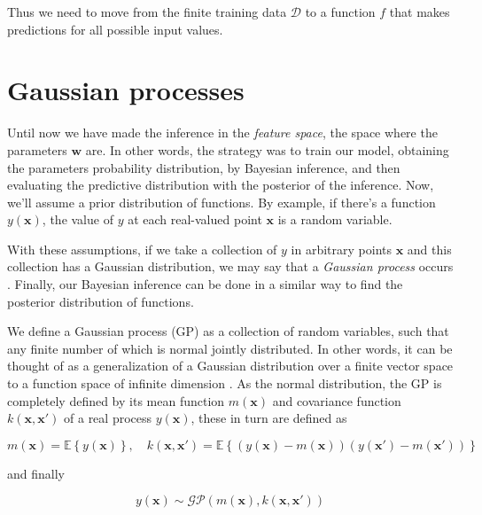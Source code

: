 \documentclass[11pt]{article} %
\begin{document}
Thus we need to move from the finite training data $\mathcal{D}$ to a function $f$ that makes predictions for all possible input values. %

\section{Gaussian processes}

Until now we have made the inference in the \textit{feature space}, the space where the parameters $\mathbf{w}$ are. In other words, the strategy was to train our model, obtaining the parameters probability distribution, by Bayesian inference, and then evaluating the predictive distribution with the posterior of the inference. Now, we'll assume a prior distribution of functions. By example, if there's a function $y(\mathbf{x})$, the value of $y$ at each real-valued point $\mathbf{x}$ is a random variable.

With these assumptions, if we take a collection of $y$ in arbitrary points $\mathbf{x}$ and this collection has a Gaussian distribution, we may say that a \textit{Gaussian process} occurs \cite{Rasmussen:2005:GPM:1162254}. Finally, our Bayesian inference can be done in a similar way to find the posterior distribution of functions.

We define a Gaussian process (GP) as a collection of random variables, such that any finite number of which is normal jointly distributed. In other words, it can be thought  of as a generalization of a Gaussian distribution over a finite vector space to a function space of infinite dimension \cite{mackay1998introduction}. As the normal distribution, the GP is completely defined by its mean function $m(\mathbf{x})$ and covariance function $k(\mathbf{x},\mathbf{x'})$ of a real process $y(\mathbf{x})$, these in turn are defined as

\begin{equation}
   m(\mathbf{x}) = \mathbb{E}\left\{ y(\mathbf{x}) \right\}, \quad
   k(\mathbf{x},\mathbf{x'}) = \mathbb{E}\left\{ \left( y(\mathbf{x}) - m(\mathbf{x}) \right) \left( y(\mathbf{x'}) - m(\mathbf{x'}) \right) \right\}
\end{equation}

and finally

\begin{equation}
   y(\mathbf{x}) \sim \mathcal{GP} \left( m(\mathbf{x}), k(\mathbf{x},\mathbf{x'}) \right)
\end{equation}
\end{document}
